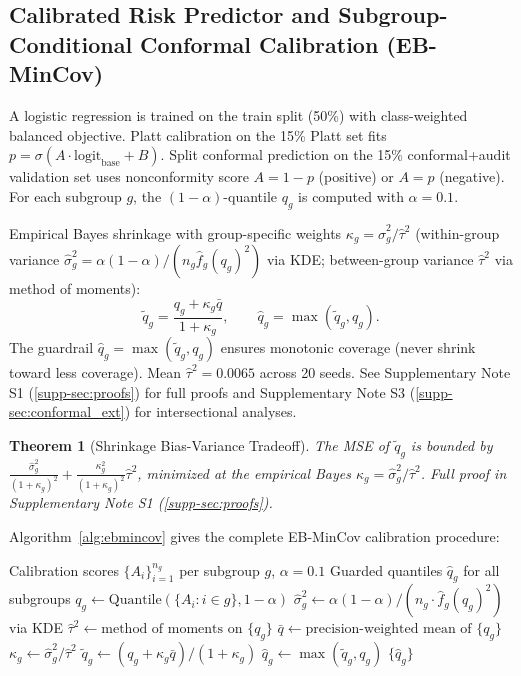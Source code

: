 \documentclass[11pt,a4paper]{article}
\theoremstyle{plain}
\newtheorem{theorem}{Theorem}
\begin{document}
\subsection{Calibrated Risk Predictor and Subgroup-Conditional Conformal Calibration (EB-MinCov)}
\label{sec:conformal}

A logistic regression is trained on the train split (50\%) with class-weighted balanced objective. Platt calibration on the 15\% Platt set fits $p = \sigma(A \cdot \text{logit}_{\text{base}} + B)$. Split conformal prediction on the 15\% conformal+audit validation set uses nonconformity score $A = 1-p$ (positive) or $A = p$ (negative). For each subgroup $g$, the $(1-\alpha)$-quantile $q_g$ is computed with $\alpha=0.1$.

Empirical Bayes shrinkage with group-specific weights $\kappa_g = \hat\sigma_g^2/\hat\tau^2$ (within-group variance $\hat\sigma_g^2 = \alpha(1-\alpha)/(n_g \hat f_g(q_g)^2)$ via KDE; between-group variance $\hat\tau^2$ via method of moments):
\begin{equation}
\tilde q_g = \frac{q_g + \kappa_g \bar q}{1+\kappa_g}, \qquad \hat q_g = \max(\tilde q_g, q_g).
\end{equation}
The guardrail $\hat q_g = \max(\tilde q_g, q_g)$ ensures monotonic coverage (never shrink toward less coverage). Mean $\hat\tau^2 = 0.0065$ across 20 seeds. See Supplementary Note S1 (\ref{supp-sec:proofs}) for full proofs and Supplementary Note S3 (\ref{supp-sec:conformal_ext}) for intersectional analyses.

\begin{theorem}[Shrinkage Bias-Variance Tradeoff]
The MSE of $\tilde q_g$ is bounded by $\frac{\hat\sigma_g^2}{(1+\kappa_g)^2} + \frac{\kappa_g^2}{(1+\kappa_g)^2}\hat\tau^2$, minimized at the empirical Bayes $\kappa_g = \hat\sigma_g^2/\hat\tau^2$. Full proof in Supplementary Note S1 (\ref{supp-sec:proofs}).
\end{theorem}

Algorithm~\ref{alg:ebmincov} gives the complete EB-MinCov calibration procedure:

\begin{algorithm}[htbp]
\caption{EB-MinCov Calibration}
\label{alg:ebmincov}
\begin{algorithmic}[1]
\Require Calibration scores $\{A_i\}_{i=1}^{n_g}$ per subgroup $g$, $\alpha=0.1$
\Ensure Guarded quantiles $\hat q_g$ for all subgroups
  \State $q_g \gets \text{Quantile}(\{A_i : i \in g\}, 1-\alpha)$
  \State $\hat\sigma_g^2 \gets \alpha(1-\alpha)/(n_g \cdot \hat f_g(q_g)^2)$ via KDE
\EndFor
\State $\hat\tau^2 \gets \text{method of moments on } \{q_g\}$
\State $\bar q \gets \text{precision-weighted mean of } \{q_g\}$
  \State $\kappa_g \gets \hat\sigma_g^2 / \hat\tau^2$
  \State $\tilde q_g \gets (q_g + \kappa_g \bar q)/(1+\kappa_g)$
  \State $\hat q_g \gets \max(\tilde q_g, q_g)$ 
\EndFor
\State \Return $\{\hat q_g\}$
\end{algorithmic}
\end{algorithm}
\end{document}
